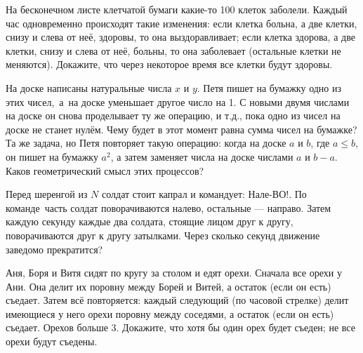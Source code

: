 \documentclass[a4paper,12pt]{article}
\begin{document}
На бесконечном листе клетчатой бумаги какие-то 100 клеток  заболели. Каждый час одновременно происходят такие изменения: если клетка больна, а две клетки, снизу и слева от неё, здоровы, то она выздоравливает;
если клетка здорова, а две клетки,
снизу и слева от неё, больны, то она заболевает
(остальные клетки не меняются). %
Докажите, что через некоторое время все клетки будут здоровы.


На доске написаны натуральные числа $x$ и $y$.
Петя пишет на бумажку одно из этих чисел,~а~на доске
уменьшает другое число на 1. С новыми двумя числами на доске
он снова проделывает ту же операцию, и т.д., пока
одно из чисел на доске не станет нулём.
Чему будет в этот момент равна сумма чисел на бумажке?
 Та же задача, но Петя повторяет такую операцию:
когда на доске $a$ и $b$, где $a\leq b$,
он
пишет на бумажку $a^2$, а затем заменяет
числа на доске числами $a$ и $b-a$.
Каков геометрический смысл этих процессов?


Перед шеренгой из $N$ солдат стоит капрал и командует:  Нале-ВО!.
По %
команде~часть солдат поворачиваются налево, остальные ---
направо. Затем %
каждую секунду каждые два солдата, стоящие
лицом друг к другу, поворачиваются друг к другу затылками.
Через сколько секунд движение заведомо прекратится?





\vfill
{}
\newpage

Аня, Боря и Витя сидят по кругу за столом и едят орехи. Сначала все
орехи у Ани. Она делит их поровну между Борей и Витей, а остаток (если
он есть) съедает. Затем всё повторяется: каждый следующий (по часовой
стрелке) делит имеющиеся у него орехи поровну между  соседями, а остаток
(если он есть) съедает. Орехов больше 3.
Докажите, что
 хотя бы один орех будет съеден;
 не все орехи будут съедены.
\end{document}
